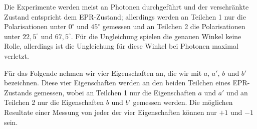 Die Experimente werden meist an Photonen durchgef\"uhrt und
der verschr\"ankte Zustand entspricht dem
EPR-Zustand; 
allerdings werden an Teilchen 1 nur
die Polarisationen unter $0^\circ$ und $45^\circ$
gemessen und an Teilchen 2 die Polarisationen
unter $22,5^\circ$ und $67,5^\circ$. F\"ur die Ungleichung
spielen die genauen Winkel 
keine Rolle, allerdings ist die Ungleichung f\"ur 
diese Winkel bei Photonen maximal
verletzt. 

F\"ur das Folgende nehmen wir vier Eigenschaften an,
die wir mit $a$, $a'$, $b$ und $b'$ bezeichnen.
Diese vier Eigenschaften werden an den beiden 
Teilchen eines EPR-Zustands gemessen, wobei
an Teilchen 1 nur die Eigenschaften $a$ und $a'$
und an Teilchen 2 nur die Eigenschaften $b$ und $b'$
gemessen werden. Die m\"oglichen Resultate
einer Messung von jeder der vier Eigenschaften
k\"onnen nur $+1$ und $-1$ sein.


